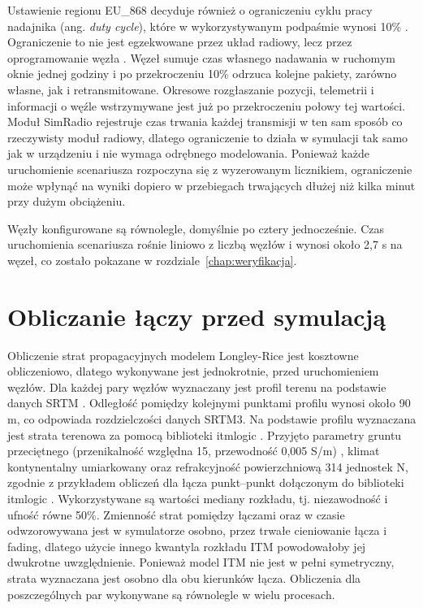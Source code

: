 Ustawienie regionu EU\_868 decyduje również o ograniczeniu cyklu pracy nadajnika (ang. \textit{duty cycle}), które w wykorzystywanym podpaśmie wynosi 10\% \cite{etsi300220}. Ograniczenie to nie jest egzekwowane przez układ radiowy, lecz przez oprogramowanie węzła \cite{meshtastic_firmware}. Węzeł sumuje czas własnego nadawania w ruchomym oknie jednej godziny i po przekroczeniu 10\% odrzuca kolejne pakiety, zarówno własne, jak i retransmitowane. Okresowe rozgłaszanie pozycji, telemetrii i informacji o węźle wstrzymywane jest już po przekroczeniu połowy tej wartości. Moduł SimRadio rejestruje czas trwania każdej transmisji w ten sam sposób co rzeczywisty moduł radiowy, dlatego ograniczenie to działa w symulacji tak samo jak w urządzeniu i nie wymaga odrębnego modelowania. Ponieważ każde uruchomienie scenariusza rozpoczyna się z wyzerowanym licznikiem, ograniczenie może wpłynąć na wyniki dopiero w przebiegach trwających dłużej niż kilka minut przy dużym obciążeniu.

Węzły konfigurowane są równolegle, domyślnie po cztery jednocześnie. Czas uruchomienia scenariusza rośnie liniowo z liczbą węzłów i wynosi około 2,7 s na węzeł, co zostało pokazane w rozdziale~\ref{chap:weryfikacja}.

\section{Obliczanie łączy przed symulacją}

Obliczenie strat propagacyjnych modelem Longley-Rice jest kosztowne obliczeniowo, dlatego wykonywane jest jednokrotnie, przed uruchomieniem węzłów. Dla każdej pary węzłów wyznaczany jest profil terenu na podstawie danych SRTM \cite{farr2007}. Odległość pomiędzy kolejnymi punktami profilu wynosi około 90 m, co odpowiada rozdzielczości danych SRTM3. Na podstawie profilu wyznaczana jest strata terenowa za pomocą biblioteki itmlogic \cite{oughton2020}. Przyjęto parametry gruntu przeciętnego (przenikalność względna 15, przewodność 0,005 S/m) \cite{hufford1982}, klimat kontynentalny umiarkowany oraz refrakcyjność powierzchniową 314 jednostek N, zgodnie z przykładem obliczeń dla łącza punkt--punkt dołączonym do biblioteki itmlogic \cite{oughton2020}. Wykorzystywane są wartości mediany rozkładu, tj. niezawodność i ufność równe 50\%. Zmienność strat pomiędzy łączami oraz w czasie odwzorowywana jest w symulatorze osobno, przez trwałe cieniowanie łącza i fading, dlatego użycie innego kwantyla rozkładu ITM powodowałoby jej dwukrotne uwzględnienie. Ponieważ model ITM nie jest w pełni symetryczny, strata wyznaczana jest osobno dla obu kierunków łącza. Obliczenia dla poszczególnych par wykonywane są równolegle w wielu procesach.

